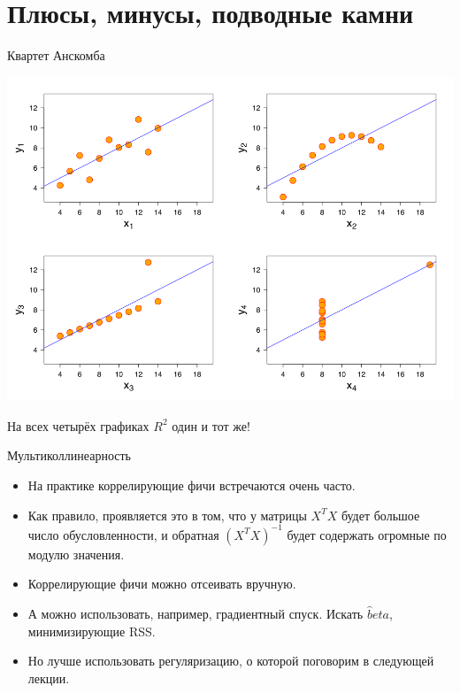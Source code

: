 \documentclass[9pt]{beamer}
\begin{document}
\section{Плюсы, минусы, подводные камни}
\begin{frame}{Квартет Анскомба}
    \begin{center}
        \includegraphics[height=0.7\textheight]{img/linear_regression_anscombes_quartet.png}        
    \end{center}
    На всех четырёх графиках $R^2$ один и тот же!
\end{frame}

\begin{frame}{Мультиколлинеарность}
    \begin{itemize}
        \item На практике коррелирующие фичи встречаются очень часто.
        \item Как правило, проявляется это в том, что у матрицы $X^TX$ будет большое число обусловленности, и обратная $(X^TX)^{-1}$ будет содержать огромные по модулю значения.
        \item Коррелирующие фичи можно отсеивать вручную.
        \item А можно использовать, например, градиентный спуск. Искать $\hat beta$, минимизирующие RSS.
        \item Но лучше использовать регуляризацию, о которой поговорим в следующей лекции.
    \end{itemize}
\end{frame}
\end{document}
